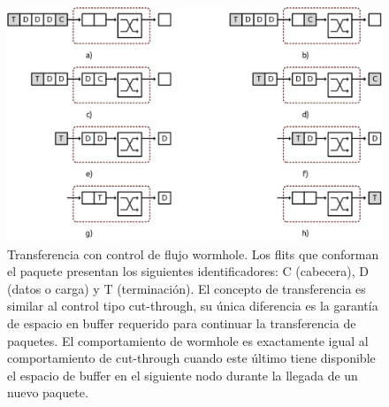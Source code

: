 \begin{figure}
	\includegraphics[width=\linewidth]{figures/ch1_wormhole.png}
	\caption
		{	
			Transferencia con control de flujo wormhole. Los flits que conforman el paquete presentan los siguientes identificadores: C (cabecera), D (datos o carga) y T (terminación).
			El concepto de transferencia es similar al control tipo cut-through, su única diferencia es la garantía de espacio en buffer requerido para continuar la transferencia de paquetes. El comportamiento de wormhole es exactamente igual al comportamiento de cut-through cuando este último tiene disponible el espacio de buffer en el siguiente nodo durante la llegada de un nuevo paquete.
		}
	\label{fig:ch1_wormhole}
\end{figure}

